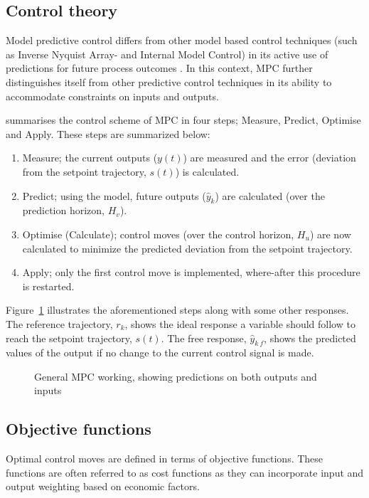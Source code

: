 \subsection{Control theory}
Model predictive control differs from other model based control techniques (such  as Inverse Nyquist Array- and Internal Model Control) in its active use of predictions for future process outcomes \citep[137]{maciejowskifb}. 
In this context, MPC further distinguishes itself from other predictive control techniques in its ability to accommodate constraints on inputs and outputs.

\citet[8]{maciejowskimpc} summarises the control scheme of MPC in four steps; Measure, Predict, Optimise and Apply. 
These steps are summarized below:
\begin{enumerate}
  \item Measure; the current outputs ($y(t)$) are measured and the error (deviation from the setpoint trajectory, $s(t)$) is calculated.
  \item Predict; using the model, future outputs ($\hat{y}_k$) are calculated (over the prediction horizon, $H_v$).
  \item Optimise (Calculate); control moves (over the control horizon, $H_u$) are now calculated to minimize the predicted deviation from the setpoint trajectory.
  \item Apply; only the first control move is implemented, where-after this procedure is restarted.
\end{enumerate}

Figure~\ref{fig:mpc:general} illustrates the aforementioned steps along with some other responses.
The reference trajectory, $r_k$, shows the ideal response a variable should follow to reach the setpoint trajectory, $s(t)$.
The free response, $\hat{y}_{k~f}$, shows the predicted values of the output if no change to the current control signal is made.

\begin{figure}[htbp]
  \centering
  \scalebox{1}{}  
  \caption[General MPC working]{General MPC working, showing predictions on both outputs and inputs \citep[8]{maciejowskimpc}}
  \label{fig:mpc:general}
\end{figure}

\subsection{Objective functions}
Optimal control moves are defined in terms of objective functions.
These functions are often referred to as cost functions \citep[41]{maciejowskimpc} as they can incorporate input and output weighting based on economic factors.

